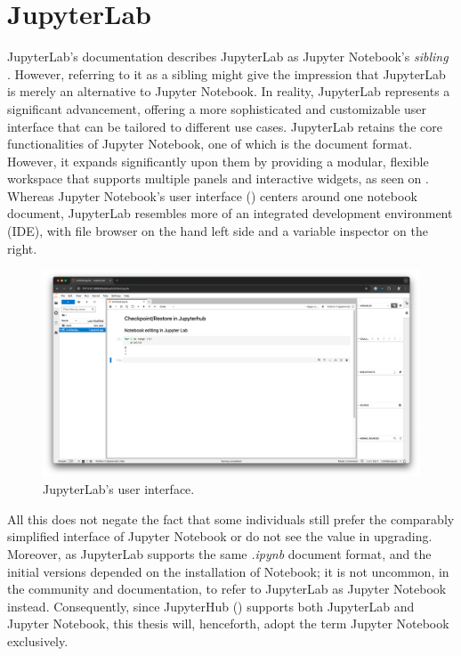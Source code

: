 \documentclass[
  digital,     %
  oneside,     %
  nosansbold,  %
  nocolorbold, %
  lof,         %
  lot,         %
]{fithesis4}
\begin{document}
\section{JupyterLab}

JupyterLab's documentation describes JupyterLab as Jupyter Notebook's \emph{sibling} \cite{jupyter_lab}. However, referring to it as a sibling might give the impression that JupyterLab is merely an alternative to Jupyter Notebook. In reality, JupyterLab represents a significant advancement, offering a more sophisticated and customizable user interface that can be tailored to different use cases. JupyterLab retains the core functionalities of Jupyter Notebook, one of which is the document format. However, it expands significantly upon them by providing a modular, flexible workspace that supports multiple panels and interactive widgets, as seen on . Whereas Jupyter Notebook's user interface () centers around one notebook document, JupyterLab resembles more of an integrated development environment (IDE), with file browser on the hand left side and a variable inspector on the right.

\begin{figure}[H]
  \begin{center}
  \includegraphics[width=\textwidth]{figures/jupyter-lab-extended-screenshot.png}
  \end{center}
  \caption{JupyterLab's user interface.}
  \label{fig:jupyter-lab-screenshot}
\end{figure}

All this does not negate the fact that some individuals still prefer the comparably simplified interface of Jupyter Notebook or do not see the value in upgrading. Moreover, as JupyterLab supports the same \emph{.ipynb} document format, and the initial versions depended on the installation of Notebook; it is not uncommon, in the community and documentation, to refer to JupyterLab as Jupyter Notebook instead. Consequently, since JupyterHub () supports both JupyterLab and Jupyter Notebook, this thesis will, henceforth, adopt the term Jupyter Notebook exclusively.
\end{document}

